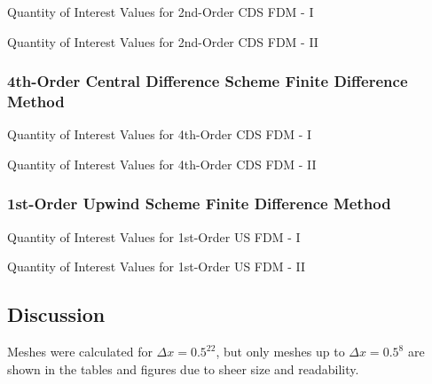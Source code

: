 \documentclass[10pt, reqno]{article}		%
\numberwithin{equation}{section}
\begin{document}
\begin{table}[H]
	\caption{Quantity of Interest Values for 2nd-Order CDS FDM - I}	
	
\end{table}

\newpage

\begin{table}[H]
	\caption{Quantity of Interest Values for 2nd-Order CDS FDM - II}	
	
\end{table}

\newpage

\subsubsection{4th-Order Central Difference Scheme Finite Difference Method}

\begin{table}[H]
	\caption{Quantity of Interest Values for 4th-Order CDS FDM - I}
		
\end{table}

\newpage

\begin{table}[H]
	\caption{Quantity of Interest Values for 4th-Order CDS FDM - II}
		
\end{table}

\newpage

\subsubsection{1st-Order Upwind Scheme Finite Difference Method}

\begin{table}[H]
	\caption{Quantity of Interest Values for 1st-Order US FDM - I}
		
\end{table}

\newpage

\begin{table}[H]
	\caption{Quantity of Interest Values for 1st-Order US FDM - II}	
	
\end{table}

\newpage

\subsection{Discussion}

Meshes were calculated for $\Delta x = 0.5^{22}$, but only meshes up to $\Delta x = 0.5^8$ are shown in the tables and figures due to sheer size and readability.
\end{document}
